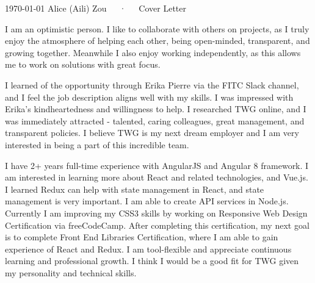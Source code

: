 \documentclass[11pt, a4paper]{awesome-cv}
\begin{document}
\makecvheader[R]

\makecvfooter
  {\today}
  {Alice (Aili) Zou~~~·~~~Cover Letter}
  {}

\makelettertitle

\begin{cvletter}

I am an optimistic person. I like to collaborate with others on projects, as I truly enjoy the atmosphere of helping each other, being open-minded, transparent, and growing together. Meanwhile I also enjoy working independently, as this allows me to work on solutions with great focus.

I learned of the opportunity through Erika Pierre via the FITC Slack channel, and I feel the job description aligns well with my skills. I was impressed with Erika's kindheartedness and willingness to help. I researched TWG online, and I was immediately attracted - talented, caring colleagues, great management, and transparent policies. I believe TWG is my next dream employer and I am very interested in being a part of this incredible team.

I have 2+ years full-time experience with AngularJS and Angular 8 framework. I am interested in learning more about React and related technologies, and Vue.js. I learned Redux can help with state management in React, and state management is very important. I am able to create API services in Node.js. Currently I am improving my CSS3 skills by working on Responsive Web Design Certification via freeCodeCamp. After completing this certification, my next goal is to complete Front End Libraries Certification, where I am able to gain experience of React and Redux. I am tool-flexible and  appreciate continuous learning and professional growth. I think I would be a good fit for TWG given my personality and technical skills.



\end{cvletter}


\makeletterclosing
\end{document}
